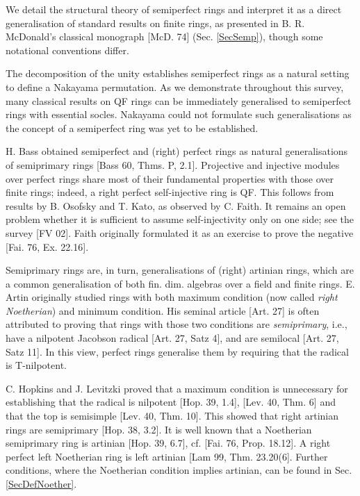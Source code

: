 \documentclass[11pt]{article}
\theoremstyle{plain}
\theoremstyle{remark}
\theoremstyle{plain}
\begin{document}
We detail the structural theory of semiperfect rings and interpret it as a direct generalisation of standard results on finite rings, as presented in B. R. McDonald's classical monograph [McD. 74] (Sec. \ref{SecSemp}), though some notational conventions differ. 

The decomposition of the unity establishes semiperfect rings as a natural setting to define a Nakayama permutation. As we demonstrate throughout this survey, many classical results on QF rings can be immediately generalised to semiperfect rings with essential socles.  Nakayama could not formulate such generalisations as the concept of a semiperfect ring was yet to be established. 


\smallskip

H. Bass obtained semiperfect and (right) perfect rings as natural generalisations of semiprimary rings [Bass 60, Thms. P, 2.1]. Projective and injective modules over perfect rings share most of their fundamental properties with those over finite rings; indeed, a right perfect self-injective ring is QF. This follows from results by B. Osofsky and T. Kato, as observed by C. Faith. It remains an open problem whether it is sufficient to assume self-injectivity only on one side; see the survey [FV 02]. Faith originally formulated it as an exercise to prove the negative [Fai. 76, Ex. 22.16]. %



Semiprimary rings are, in turn, generalisations of (right) artinian rings, which are a common generalisation of both fin. dim. algebras over a field and finite rings. E. Artin originally studied rings with both maximum condition (now called \textit{right Noetherian}) and minimum condition. His seminal article [Art. 27] is often attributed to proving that rings with those two conditions are \textit{semiprimary}, i.e., have a nilpotent Jacobson radical [Art. 27, Satz 4], and are semilocal [Art. 27, Satz 11]. In this view, perfect rings generalise them by requiring that the radical is T-nilpotent.

C. Hopkins and J. Levitzki proved that a maximum condition is unnecessary for establishing that the radical is nilpotent [Hop. 39, 1.4], [Lev. 40, Thm. 6] and that the top is semisimple [Lev. 40, Thm. 10]. This showed that right artinian rings are semiprimary [Hop. 38, 3.2]. It is well known that a Noetherian semiprimary ring is artinian [Hop. 39, 6.7], cf. [Fai. 76, Prop. 18.12]. A right perfect left Noetherian ring is left artinian [Lam 99, Thm. 23.20(6]. Further conditions, where the Noetherian condition implies artinian, can be found in Sec. \ref{SecDefNoether}.
\end{document}
